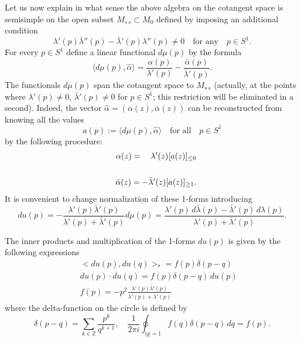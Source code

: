 \documentclass[numbook, envcountsame, envcountreset]{svjour3}
\begin{document}
Let us now explain in what sense the above algebra on the cotangent space is semisimple on the open subset $M_{s\, s}\subset M_0$ 
defined by imposing an additional condition
\begin{equation}\label{ss0}
\lambda'(p)\bar\lambda''(p)-\bar\lambda'(p)\lambda''(p)\neq 0\quad \mbox{for any}\quad p\in S^1.
\end{equation}
For every $p\in S^1$ define a linear functional $d\mu(p)$ by the formula
\begin{equation}\label{ss1}
\langle d\mu(p), \hat\alpha\rangle= \frac{\alpha(p)}{\lambda'(p)}-\frac{\bar\alpha(p)}{\bar\lambda'(p)}.
\end{equation}
The functionals $d\mu(p)$ span the cotangent space to $M_{s\, s}$ (actually, at the points where $\lambda'(p)\neq 0$, $\bar\lambda'(p)\neq 0$ for $p\in S^1$; this restriction will be eliminated in a second). Indeed, the vector $\hat\alpha=(\alpha(z), \bar\alpha(z))$ can be reconstructed from knowing all the values
$$
a(p):= \langle d\mu(p), \hat\alpha\rangle \quad \mbox{for all} \quad p\in S^1
$$
by the following procedure:
\begin{eqnarray}\label{ss2}
&&
\alpha(z) =\quad  \lambda'(z) [a(z)]_{\leq 0}
{\nonumber}\\
&&
\\
&&
\bar\alpha(z) =- \bar\lambda'(z) [a(z)]_{\geq 1}.
{\nonumber}
\end{eqnarray}
It is convenient to change normalization of these 1-forms introducing
\begin{equation}\label{ss3}
du(p) = -\frac{\lambda'(p) \bar\lambda'(p)}{\lambda'(p)+\bar\lambda'(p)} d\mu(p) = \frac{\lambda'(p) \, d\bar\lambda(p) -\bar \lambda'(p)\, d\lambda(p)}{\lambda'(p)+\bar\lambda'(p)}.
\end{equation}

\begin{lemma} \label{prop-ss}The inner products and multiplication of the 1-forms $du(p)$ is given by the following expressions
\begin{eqnarray}\label{ss4}
&&
<du(p), du(q)>_* =f(p)\delta(p-q)
\\
&&
du(p)\cdot du(q) =f(p)\delta(p-q) \, du(p)
\label{ss5}
\\
&&
f(p)=-p^2 \frac{\lambda'(p) \bar\lambda'(p)}{\lambda'(p)+\bar\lambda'(p)} 
\end{eqnarray}
where the delta-function on the circle is defined by
$$
\delta(p-q) =\sum_{k\in\mathbb Z} \frac{p^k}{q^{k+1}}, \quad \frac1{2\pi i} \oint_{|q|=1} f(q) \delta(p-q)\, dq=f(p).
$$
\end{lemma}
\end{document}
